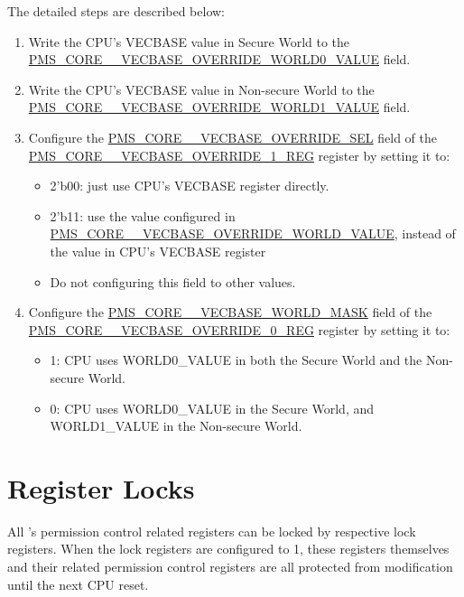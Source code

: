 \documentclass[main\_\_EN.tex]{subfiles}
\begin{document}
The detailed steps are described below:
\begin{enumerate}
    \item Write the CPU's VECBASE value in Secure World to the \hyperref[fielddesc:PMSCORE0VECBASEOVERRIDEWORLD0VALUE]{PMS\_CORE\_\_VECBASE\_OVERRIDE\_WORLD0\_VALUE} field.
    \item Write the CPU's VECBASE value in Non-secure World to the \hyperref[fielddesc:PMSCORE0VECBASEOVERRIDEWORLD1VALUE]{PMS\_CORE\_\_VECBASE\_OVERRIDE\_WORLD1\_VALUE} field.
    \item Configure the \hyperref[fielddesc:PMSCORE0VECBASEOVERRIDESEL]{PMS\_CORE\_\_VECBASE\_OVERRIDE\_SEL} field of the \hyperref[regdesc:PMSCORE0VECBASEOVERRIDE1REG]{PMS\_CORE\_\_VECBASE\_OVERRIDE\_1\_REG} register by setting it to:
        \begin{itemize}
            \item 2'b00: just use CPU's VECBASE register directly.
            \item 2'b11: use the value configured in \hyperref[fielddesc:PMSCORE0VECBASEOVERRIDEWORLD0VALUE]{PMS\_CORE\_\_VECBASE\_OVERRIDE\_WORLD\_VALUE}, instead of the value in CPU's VECBASE register
            \item Do not configuring this field to other values.
        \end{itemize}
    \item Configure the \hyperref[fielddesc:PMSCORE0VECBASEWORLDMASK]{PMS\_CORE\_\_VECBASE\_WORLD\_MASK} field of the  \hyperref[regdesc:PMSCORE0VECBASEOVERRIDE1REG]{PMS\_CORE\_\_VECBASE\_OVERRIDE\_0\_REG} register by setting it to:
        \begin{itemize}
            \item 1: CPU uses WORLD0\_VALUE in both the Secure World and the Non-secure World.
            \item 0: CPU uses WORLD0\_VALUE in the Secure World, and WORLD1\_VALUE in the Non-secure World.
        \end{itemize}
\end{enumerate}

\section{Register Locks}
All \chipname{}'s permission control related registers can be locked by respective lock registers. When the lock registers are configured to 1, these registers themselves and their related permission control registers are all protected from modification until the next CPU reset.
\end{document}

